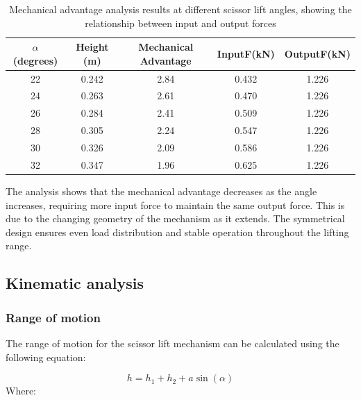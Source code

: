 \documentclass[../../main]{subfiles}
\begin{document}
\begin{table}[h!]
  \centering
  \begin{tcolorbox}[
    colback=red!5!white,colframe=red!75!black,
    title={\textbf{Mechanical advantage analysis}},
    fonttitle=\bfseries, coltitle=white, width=0.98\linewidth]
  \begin{tabular}{|c|c|c|c|c|}
      \hline \rowcolor{red!20}
      $\alpha$ (degrees) & Height (m) & Mechanical Advantage &InputF(kN) & OutputF(kN) \\ \hline
      22 & 0.242 & 2.84 & 0.432 & 1.226 \\ \hline
      24 & 0.263 & 2.61 & 0.470 & 1.226 \\ \hline
      26 & 0.284 & 2.41 & 0.509 & 1.226 \\ \hline
      28 & 0.305 & 2.24 & 0.547 & 1.226 \\ \hline
      30 & 0.326 & 2.09 & 0.586 & 1.226 \\ \hline
      32 & 0.347 & 1.96 & 0.625 & 1.226 \\ \hline
  \end{tabular}
\end{tcolorbox}
  \caption{Mechanical advantage analysis results at different scissor lift angles, showing the relationship between input and output forces}
  \label{tab:mechanical_advantage}
\end{table}


The analysis shows that the mechanical advantage decreases as the angle
increases, requiring more input force to maintain the same output force.
This is due to the changing geometry of the mechanism as it extends. The
symmetrical design ensures even load distribution and stable operation
throughout the lifting range.
\newpage
\subsection{Kinematic analysis}\label{kinematic-analysis}

\subsubsection{Range of motion}

The range of motion for the scissor lift mechanism can be calculated
using the following equation:

\begin{equation}
  h = h_1 + h_2 + a \sin(\alpha)
\end{equation}
Where:
\end{document}
